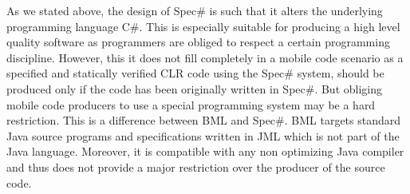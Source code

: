   As we stated above, the design of Spec\# is such that it alters the underlying programming language C\#. This is especially suitable for 
 producing a high level quality software as programmers are obliged to respect a certain programming discipline. However,  this it does not fill completely 
 in a mobile code scenario as a specified and statically verified CLR code using the Spec\#  system, should be produced only if the code has been
 originally written in Spec\#. But obliging mobile code producers to use a special
 programming system may be a hard restriction. This is a difference between BML and Spec\#.
 BML targets  standard Java source programs and specifications written in JML which is not part of the Java language. 
 Moreover, it is compatible with any non optimizing Java compiler and thus does not provide a major restriction over the producer of the source code. 


 
 


